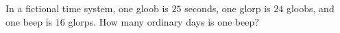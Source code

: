 In a fictional time system, one gloob is $25$ seconds, one glorp is $24$ gloobs, and one beep is $16$ glorps. How many ordinary days is one beep?
